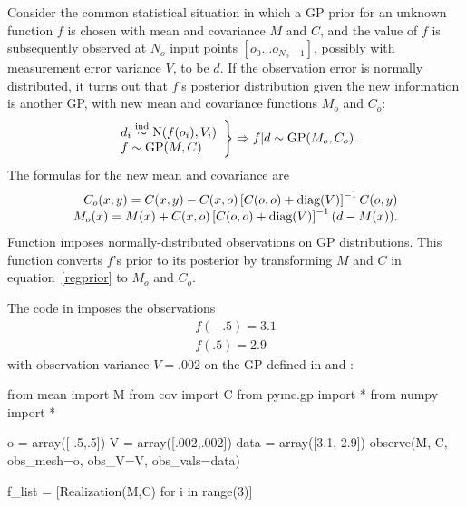 \documentclass[article]{jss}
\begin{document}
Consider the common statistical situation in which a GP prior for an unknown function $f$ is chosen with mean and covariance $M$ and $C$, and the value of $f$ is subsequently observed at $N_o$ input points $[o_0\ldots o_{N_o-1}]$, possibly with measurement error variance $V$, to be $d$. If the observation error is normally distributed, it turns out that $f$'s posterior distribution given the new information is another GP, with new mean and covariance functions $M_o$ and $C_o$:
\begin{equation}
    \label{regprior}
    \left.\begin{array}{l}
        d_i \stackrel{\tiny{\textup{ind}}}{\sim} \textup{N}(f(o_i), V_i)\\
        f \sim \textup{GP}(M,C)\\
    \end{array}\right\}\Rightarrow f|d \sim \textup{GP}(M_o, C_o).
\end{equation}
The formulas for the new mean and covariance are
\begin{equation}
    \label{eq:obs-formula}
    \begin{array}{r}
        C_o(x,y) = C(x,y)-C(x,o)\left[C(o,o)+\textup{diag}(V)\right]^{-1}C(o,y)\\
        M_o(x) = M(x)+C(x,o)\left[C(o,o)+\textup{diag}(V)\right]^{-1}(d-M(x)).
    \end{array} 
\end{equation}
Function  imposes normally-distributed observations on GP distributions. This function converts $f$'s prior to its posterior by transforming $M$ and $C$ in equation~\ref{regprior} to $M_o$ and $C_o$.

The code in  imposes the observations
\begin{eqnarray*}
    f(-.5) = 3.1\\
    f(.5) = 2.9
\end{eqnarray*}
with observation variance $V=.002$ on the GP defined in  and :
\begin{CodeChunk}
\begin{CodeInput}
from mean import M
from cov import C
from pymc.gp import *
from numpy import *

o = array([-.5,.5])
V = array([.002,.002])
data = array([3.1, 2.9])
observe(M, C, obs_mesh=o, obs_V=V, obs_vals=data)

f_list = [Realization(M,C) for i in range(3)]
\end{CodeInput}
\end{CodeChunk}
\end{document}
